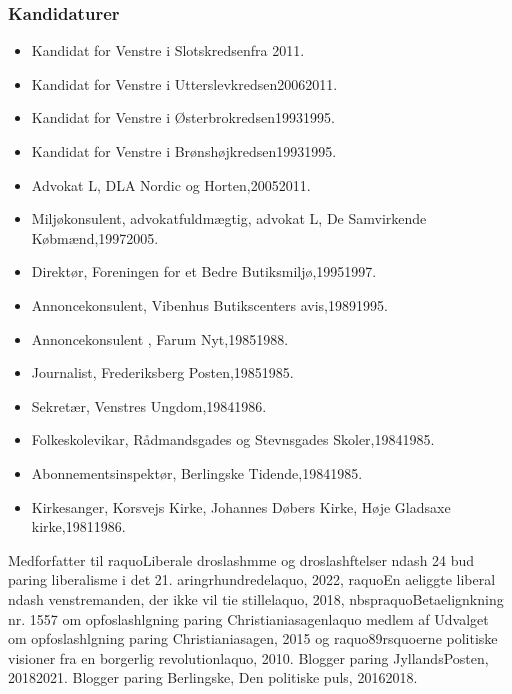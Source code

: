 \documentclass[11pt, a4paper]{awesome-cv}
\begin{document}
\begin{cvletter}
\subsubsection*{Kandidaturer}
\begin{itemize}
\item Kandidat for Venstre i Slotskredsenfra 2011.
\item Kandidat for Venstre i Utterslevkredsen20062011.
\item Kandidat for Venstre i Østerbrokredsen19931995.
\item Kandidat for Venstre i Brønshøjkredsen19931995.
\end{itemize}
\begin{itemize}
\item Advokat L, DLA Nordic og Horten,20052011.
\item Miljøkonsulent, advokatfuldmægtig, advokat L, De Samvirkende Købmænd,19972005.
\item Direktør, Foreningen for et Bedre Butiksmiljø,19951997.
\item Annoncekonsulent, Vibenhus Butikscenters avis,19891995.
\item Annoncekonsulent , Farum Nyt,19851988.
\item Journalist, Frederiksberg Posten,19851985.
\item Sekretær, Venstres Ungdom,19841986.
\item Folkeskolevikar, Rådmandsgades og Stevnsgades Skoler,19841985.
\item Abonnementsinspektør, Berlingske Tidende,19841985.
\item Kirkesanger, Korsvejs Kirke, Johannes Døbers Kirke, Høje Gladsaxe kirke,19811986.
\end{itemize}
Medforfatter til raquoLiberale droslashmme og droslashftelser ndash 24 bud paring liberalisme i det 21. aringrhundredelaquo, 2022, raquoEn aeliggte liberal ndash venstremanden, der ikke vil tie stillelaquo, 2018, nbspraquoBetaelignkning nr. 1557 om opfoslashlgning paring Christianiasagenlaquo medlem af Udvalget om opfoslashlgning paring Christianiasagen, 2015 og raquo89rsquoerne  politiske visioner fra en borgerlig revolutionlaquo, 2010. Blogger paring JyllandsPosten, 20182021. Blogger paring Berlingske, Den politiske puls, 20162018.

\end{cvletter}
\end{document}
